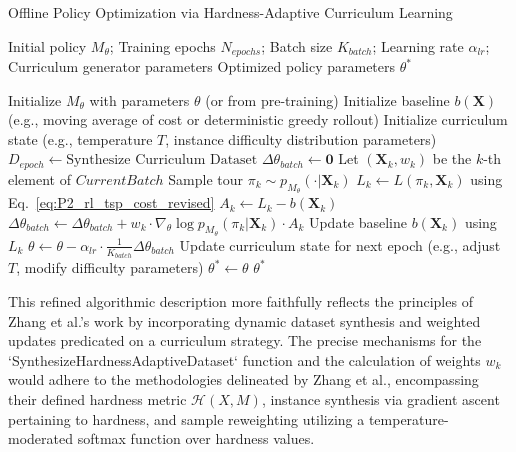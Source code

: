 \documentclass[10pt,conference,letterpaper]{IEEEtran}
\begin{document}
\begin{algorithm}[h!]
\caption{Offline Policy Optimization via Hardness-Adaptive Curriculum Learning}
\label{alg:offline_training_hac}
\begin{algorithmic}[1] %
\REQUIRE Initial policy $M_{\theta}$; Training epochs $N_{epochs}$; Batch size $K_{batch}$; Learning rate $\alpha_{lr}$; Curriculum generator parameters
\ENSURE Optimized policy parameters $\theta^*$

\STATE Initialize $M_{\theta}$ with parameters $\theta$ (or from pre-training)
\STATE Initialize baseline $b(\mathbf{X})$ (e.g., moving average of cost or deterministic greedy rollout)
\STATE Initialize curriculum state (e.g., temperature $T$, instance difficulty distribution parameters)
    \STATE $D_{epoch} \leftarrow \text{Synthesize Curriculum Dataset}$
        \STATE $\Delta\theta_{batch} \leftarrow \mathbf{0}$
            \STATE Let $(\mathbf{X}_k, w_k)$ be the $k$-th element of $CurrentBatch$
            \STATE Sample tour $\pi_k \sim p_{M_{\theta}}(\cdot|\mathbf{X}_k)$
            \STATE $L_k \leftarrow L(\pi_k, \mathbf{X}_k)$ using Eq.~\eqref{eq:P2_rl_tsp_cost_revised}
            \STATE $A_k \leftarrow L_k - b(\mathbf{X}_k)$
            \STATE $\Delta\theta_{batch} \leftarrow \Delta\theta_{batch} + w_k \cdot \nabla_{\theta} \log p_{M_{\theta}}(\pi_k|\mathbf{X}_k) \cdot A_k$
            \STATE Update baseline $b(\mathbf{X}_k)$ using $L_k$
        \ENDFOR
        \STATE $\theta \leftarrow \theta - \alpha_{lr} \cdot \frac{1}{K_{batch}} \Delta\theta_{batch}$ 
    \ENDFOR
    \STATE Update curriculum state for next epoch (e.g., adjust $T$, modify difficulty parameters)
\ENDFOR
\STATE $\theta^* \leftarrow \theta$
\RETURN $\theta^*$
\end{algorithmic}
\end{algorithm}

This refined algorithmic description more faithfully reflects the principles of Zhang et al.'s work by incorporating dynamic dataset synthesis and weighted updates predicated on a curriculum strategy. The precise mechanisms for the `SynthesizeHardnessAdaptiveDataset` function and the calculation of weights $w_k$ would adhere to the methodologies delineated by Zhang et al., encompassing their defined hardness metric $\mathcal{H}(X,M)$, instance synthesis via gradient ascent pertaining to hardness, and sample reweighting utilizing a temperature-moderated softmax function over hardness values.
\end{document}
